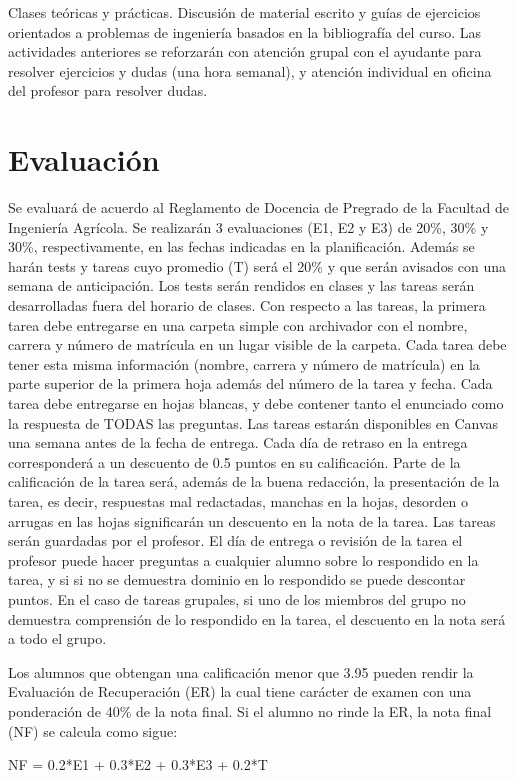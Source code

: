 \documentclass[11pt]{article}
\begin{document}
Clases teóricas y prácticas. Discusión de material escrito y guías de ejercicios orientados a problemas de ingeniería basados en la bibliografía del curso. Las actividades anteriores se reforzarán con atención grupal con el ayudante para resolver ejercicios y dudas (una hora semanal), y atención individual en oficina del profesor para resolver dudas.


\section{Evaluación}
\label{sec:orgc3cadd0}
Se evaluará de acuerdo al Reglamento de Docencia de Pregrado de la Facultad de Ingeniería Agrícola. Se realizarán 3 evaluaciones (E1, E2 y E3) de 20\%, 30\% y 30\%, respectivamente, en las fechas indicadas en la planificación. Además se harán tests y tareas cuyo promedio (T) será el 20\% y que serán avisados con una semana de anticipación. Los tests serán rendidos en clases y las tareas serán desarrolladas fuera del horario de clases.
Con respecto a las tareas, la primera tarea debe entregarse en una carpeta simple con archivador con el nombre, carrera y número de matrícula en un lugar visible de la carpeta. Cada tarea debe tener esta misma información (nombre, carrera y número de matrícula) en la parte superior de la primera hoja además del número de la tarea y fecha. Cada tarea debe entregarse en hojas blancas, y debe contener tanto el enunciado como la respuesta de TODAS las preguntas. Las tareas estarán disponibles en Canvas una semana antes de la fecha de entrega. Cada día de retraso en la entrega corresponderá a un descuento de 0.5 puntos en su calificación. Parte de la calificación de la tarea será, además de la buena redacción, la presentación de la tarea, es decir, respuestas mal redactadas, manchas en la hojas, desorden o arrugas en las hojas significarán un descuento en la nota de la tarea. Las tareas serán guardadas por el profesor. El día de entrega o revisión de la tarea el profesor puede hacer preguntas a cualquier alumno sobre lo respondido en la tarea, y si si no se demuestra dominio en lo respondido se puede descontar puntos. En el caso de tareas grupales, si uno de los miembros del grupo no demuestra comprensión de lo respondido en la tarea, el descuento en la nota será a todo el grupo.

Los alumnos que obtengan una calificación menor que 3.95 pueden rendir la Evaluación de Recuperación (ER) la cual tiene carácter de examen con una ponderación de 40\% de la nota final.
Si el alumno no rinde la ER, la nota final (NF) se calcula como sigue:
\begin{center}
NF  = 0.2*E1 + 0.3*E2 + 0.3*E3 + 0.2*T
\end{center}
\end{document}
